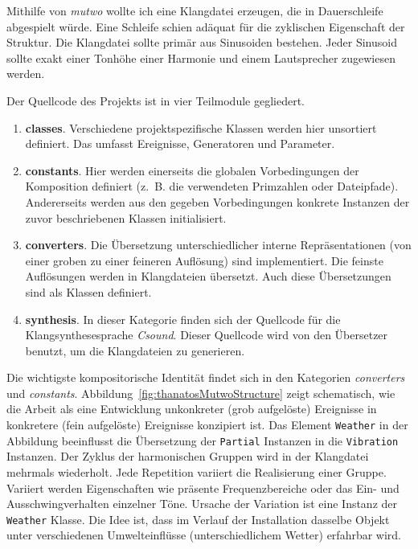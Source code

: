 \documentclass[12pt,a4paper,ngerman]{article}
\begin{document}
Mithilfe von \emph{mutwo} wollte ich eine Klangdatei erzeugen, die in Dauerschleife abgespielt würde.
Eine Schleife schien adäquat für die zyklischen Eigenschaft der Struktur.
Die Klangdatei sollte primär aus Sinusoiden bestehen.
Jeder Sinusoid sollte exakt einer Tonhöhe einer Harmonie und einem Lautsprecher zugewiesen werden.

\smallskip

Der Quellcode des Projekts ist in vier Teilmodule gegliedert.

\begin{enumerate}
    \item{%
        \textbf{classes}.
        Verschiedene projektspezifische Klassen werden hier unsortiert definiert.
        Das umfasst Ereignisse, Generatoren und Parameter.
    }

    \item{%
        \textbf{constants}.
        Hier werden einerseits die globalen Vorbedingungen der Komposition definiert (z.~B. die verwendeten Primzahlen oder Dateipfade).
        Andererseits werden aus den gegeben Vorbedingungen konkrete Instanzen der zuvor beschriebenen Klassen initialisiert.
    }

    \item{%
        \textbf{converters}.
        Die Übersetzung unterschiedlicher interne Repräsentationen (von einer groben zu einer feineren Auflösung) sind implementiert.
        Die feinste Auflösungen werden in Klangdateien übersetzt.
        Auch diese Übersetzungen sind als Klassen definiert.
    }

    \item{%
        \textbf{synthesis}.
        In dieser Kategorie finden sich der Quellcode für die Klangsynthesesprache \emph{Csound}.
        Dieser Quellcode wird von den Übersetzer benutzt, um die Klangdateien zu generieren.
    }
\end{enumerate}

Die wichtigste kompositorische Identität findet sich in den Kategorien \emph{converters} und \emph{constants}.
Abbildung~\ref{fig:thanatosMutwoStructure} zeigt schematisch, wie die Arbeit als eine Entwicklung unkonkreter (grob aufgelöste) Ereignisse in konkretere (fein aufgelöste) Ereignisse konzipiert ist.
Das Element \texttt{Weather} in der Abbildung beeinflusst die Übersetzung der \texttt{Partial} Instanzen in die \texttt{Vibration} Instanzen.
Der Zyklus der harmonischen Gruppen wird in der Klangdatei mehrmals wiederholt.
Jede Repetition variiert die Realisierung einer Gruppe.
Variiert werden Eigenschaften wie präsente Frequenzbereiche oder das Ein- und Ausschwingverhalten einzelner Töne.
Ursache der Variation ist eine Instanz der \texttt{Weather} Klasse.
Die Idee ist, dass im Verlauf der Installation dasselbe Objekt unter verschiedenen Umwelteinflüsse (unterschiedlichem Wetter) erfahrbar wird.
\end{document}
